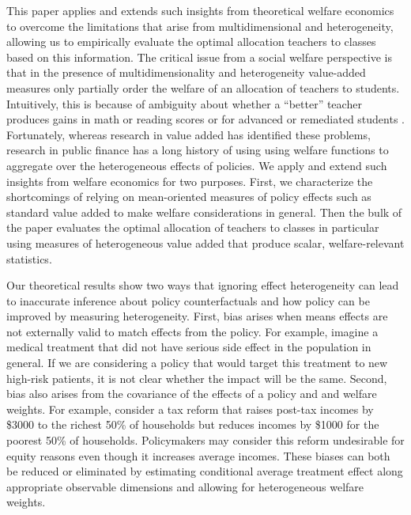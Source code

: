 \documentclass[12pt]{article}
\theoremstyle{definition}
\theoremstyle{definition}
\theoremstyle{definition}
\theoremstyle{definition}
\begin{document}
This paper applies and extends such insights from theoretical welfare economics to overcome the limitations that arise from multidimensional and heterogeneity, allowing us to empirically evaluate the optimal allocation teachers to classes based on this information.  The critical issue from a social welfare perspective is that in the presence of multidimensionality and heterogeneity value-added measures only partially order the welfare of an allocation of teachers to students.  Intuitively, this is because of ambiguity about whether a ``better'' teacher  produces gains in math or reading scores or for advanced or remediated students  \citep[see impossibility-like results in][]{condie2014teacher}. Fortunately, whereas research in value added has identified these problems, research in public finance has a long history of using using welfare functions to aggregate over the heterogeneous effects of policies. We apply and extend such insights from welfare economics for two purposes. First, we  characterize the shortcomings of relying on mean-oriented measures of policy effects such as standard value added to make welfare considerations in general. Then the bulk of the paper evaluates the optimal allocation of teachers to classes in particular using measures of heterogeneous value added that produce scalar, welfare-relevant statistics.

Our theoretical results show two ways that ignoring effect heterogeneity can lead to inaccurate inference about policy counterfactuals and how policy can be improved by measuring heterogeneity. First, bias arises when means effects are not externally valid to match effects from the policy. For example, imagine a medical treatment that did not have serious side effect in the population in general. If we are considering a policy that would target this treatment to new high-risk patients, it is not clear whether the impact will be the same. Second, bias also arises from the covariance of the effects of a policy and and welfare weights. For example, consider a tax reform that raises post-tax incomes by \$3000 to the richest 50\% of households but reduces incomes by \$1000 for the poorest 50\% of households. Policymakers may consider this reform undesirable for equity reasons even though it increases average incomes. These biases can both be reduced or eliminated by estimating conditional average treatment effect along appropriate observable dimensions and allowing for heterogeneous welfare weights.
 
\end{document}
